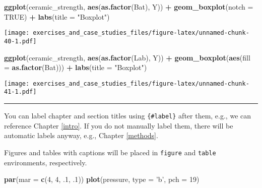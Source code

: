 \documentclass[]{book}
\newenvironment{Shaded}{\begin{snugshade}}{\end{snugshade}}
\newcommand{\DataTypeTok}[1]{\textcolor[rgb]{0.13,0.29,0.53}{#1}}
\newcommand{\DecValTok}[1]{\textcolor[rgb]{0.00,0.00,0.81}{#1}}
\newcommand{\FloatTok}[1]{\textcolor[rgb]{0.00,0.00,0.81}{#1}}
\newcommand{\KeywordTok}[1]{\textcolor[rgb]{0.13,0.29,0.53}{\textbf{#1}}}
\newcommand{\NormalTok}[1]{#1}
\newcommand{\OperatorTok}[1]{\textcolor[rgb]{0.81,0.36,0.00}{\textbf{#1}}}
\newcommand{\OtherTok}[1]{\textcolor[rgb]{0.56,0.35,0.01}{#1}}
\newcommand{\StringTok}[1]{\textcolor[rgb]{0.31,0.60,0.02}{#1}}
\theoremstyle{definition}
\theoremstyle{definition}
\theoremstyle{definition}
\theoremstyle{remark}
\begin{document}
\begin{Shaded}
\begin{Highlighting}[]
\KeywordTok{ggplot}\NormalTok{(ceramic_strength, }\KeywordTok{aes}\NormalTok{(}\KeywordTok{as.factor}\NormalTok{(Bat), Y)) }\OperatorTok{+}
\StringTok{  }\KeywordTok{geom_boxplot}\NormalTok{(}\DataTypeTok{notch =} \OtherTok{TRUE}\NormalTok{) }\OperatorTok{+}
\StringTok{  }\KeywordTok{labs}\NormalTok{(}\DataTypeTok{title =} \StringTok{"Boxplot"}\NormalTok{)}
\end{Highlighting}
\end{Shaded}

\texttt{[image: exercises\_and\_case\_studies\_files/figure-latex/unnamed-chunk-40-1.pdf]}

\begin{Shaded}
\begin{Highlighting}[]
\KeywordTok{ggplot}\NormalTok{(ceramic_strength, }\KeywordTok{aes}\NormalTok{(}\KeywordTok{as.factor}\NormalTok{(Lab), Y)) }\OperatorTok{+}
\StringTok{  }\KeywordTok{geom_boxplot}\NormalTok{(}\KeywordTok{aes}\NormalTok{(}\DataTypeTok{fill =} \KeywordTok{as.factor}\NormalTok{(Bat))) }\OperatorTok{+}
\StringTok{  }\KeywordTok{labs}\NormalTok{(}\DataTypeTok{title =} \StringTok{"Boxplot"}\NormalTok{)}
\end{Highlighting}
\end{Shaded}

\texttt{[image: exercises\_and\_case\_studies\_files/figure-latex/unnamed-chunk-41-1.pdf]}

\begin{center}\rule{0.5\linewidth}{\linethickness}\end{center}

You can label chapter and section titles using \texttt{\{\#label\}}
after them, e.g., we can reference Chapter \ref{intro}. If you do not
manually label them, there will be automatic labels anyway, e.g.,
Chapter \ref{methods}.

Figures and tables with captions will be placed in \texttt{figure} and
\texttt{table} environments, respectively.

\begin{Shaded}
\begin{Highlighting}[]
\KeywordTok{par}\NormalTok{(}\DataTypeTok{mar =} \KeywordTok{c}\NormalTok{(}\DecValTok{4}\NormalTok{, }\DecValTok{4}\NormalTok{, }\FloatTok{.1}\NormalTok{, }\FloatTok{.1}\NormalTok{))}
\KeywordTok{plot}\NormalTok{(pressure, }\DataTypeTok{type =} \StringTok{'b'}\NormalTok{, }\DataTypeTok{pch =} \DecValTok{19}\NormalTok{)}
\end{Highlighting}
\end{Shaded}
\end{document}
